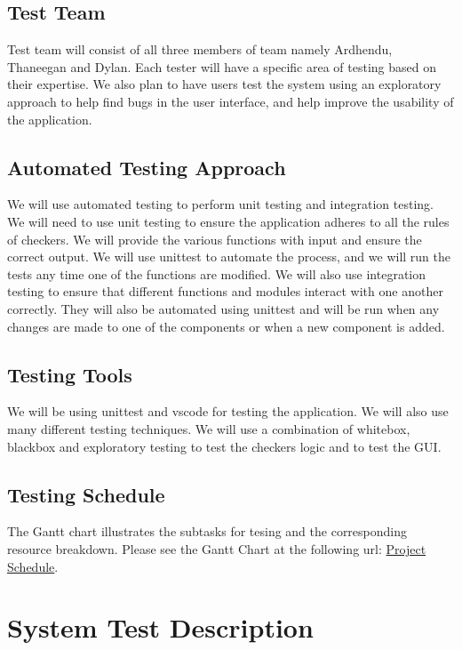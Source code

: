 \documentclass[12pt, titlepage]{article}
\begin{document}
\subsection{Test Team}
Test team will consist of all three members of team namely Ardhendu, Thaneegan and Dylan. Each tester will have a specific area of testing based on their expertise. We also plan to have users test the system using an exploratory approach to help find bugs in the user interface, and help improve the usability of the application.

\subsection{Automated Testing Approach}
We will use automated testing to perform unit testing and integration testing. We will need to use unit testing to ensure the application adheres to all the rules of checkers. We will provide the various functions with input and ensure the correct output. We will use unittest to automate the process, and we will run the tests any time one of the functions are modified. We will also use integration testing to ensure that different functions and modules interact with one another correctly. They will also be automated using unittest and will be run when any changes are made to one of the components or when a new component is added.

\subsection{Testing Tools}
We will be using unittest and vscode for testing the application. We will also use many different testing techniques. We will use a combination of whitebox, blackbox and exploratory testing to test the checkers logic and to test the GUI.

\subsection{Testing Schedule}
The Gantt chart illustrates the subtasks for tesing and the corresponding resource breakdown.
Please see the Gantt Chart at the following url: \href{https://gitlab.cas.mcmaster.ca/bargea/3xa3-g09-2021/-/blob/master/BlankProjectTemplate/ProjectSchedule/3XA3\%20Group\%20Project.pdf}{Project Schedule}.

\section{System Test Description}
	
\end{document}
